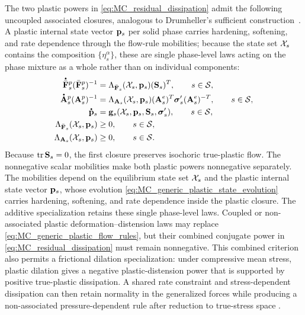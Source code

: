 The two plastic powers in \eqref{eq:MC_residual_dissipation} admit the following
uncoupled associated closures, analogous to Drumheller's sufficient
construction~\cite{drumheller2000}.  A plastic internal state vector
\(\mathbf{p}_s\) per solid phase carries hardening, softening, and rate
dependence through the flow-rule mobilities; because the state set \(\mathcal{X}_s\)
contains the composition \(\{\eta_s^\alpha\}\), these are single phase-level
laws acting on the phase mixture as a whole rather than on individual
components:
%
\begin{subequations}
	\label{eq:MC_generic_plastic_flow_rules}
	\begin{align}
		\phasedot{\bar{\mbf F}}_s^p(\bar{\mbf F}_s^p)^{-1}
		 & =
		\Lambda_{\bar{\mbf F}_s}(\mc X_s,\mbf p_s)
		(\mbf S_s)^T,
		\qquad
		s\in\mc S,
		\label{eq:MC_generic_plastic_deformation_flow_rule}            \\
		\phasedot{\mbf A}_s^p(\mbf A_s^p)^{-1}
		 & =
		\Lambda_{\mbf A_s}(\mc X_s,\mbf p_s)
		(\mbf A_s^e)^T
		\bs\sigma_s'
		(\mbf A_s^e)^{-T},
		\qquad
		s\in\mc S,
		\label{eq:MC_generic_plastic_distension_flow_rule}             \\
		\phasedot{\mbf p}_s
		 & =
		\mbf g_s
		(\mc X_s,\mbf p_s,\mbf S_s,\bs\sigma_s'),
		\qquad
		s\in\mc S,
		\label{eq:MC_generic_plastic_state_evolution} \\
		\Lambda_{\bar{\mbf F}_s}(\mc X_s,\mbf p_s)
		 & \ge0,
		\qquad
		s\in\mc S,
		\label{eq:MC_generic_plastic_deformation_mobility_nonnegative} \\
		\Lambda_{\mbf A_s}(\mc X_s,\mbf p_s)
		 & \ge0,
		\qquad
		s\in\mc S .
		\label{eq:MC_generic_plastic_distension_mobility_nonnegative}
	\end{align}
\end{subequations}
%
Because \(\operatorname{tr}\mathbf{S}_s=0\), the first closure preserves
isochoric true-plastic flow.  The nonnegative scalar mobilities make both
plastic powers nonnegative separately.  The mobilities depend on the
equilibrium state set \(\mathcal{X}_s\) and the plastic internal state vector
\(\mathbf{p}_s\), whose evolution
\eqref{eq:MC_generic_plastic_state_evolution} carries hardening, softening,
and rate dependence inside the plastic closure.  The additive specialization
retains these single phase-level laws.  Coupled or non-associated
plastic deformation--distension laws may replace
\eqref{eq:MC_generic_plastic_flow_rules}, but their combined conjugate power in
\eqref{eq:MC_residual_dissipation} must remain nonnegative.  This combined
criterion also permits a frictional dilation specialization: under compressive
mean stress, plastic dilation gives a negative plastic-distension power that is
supported by positive true-plastic dissipation.  A shared rate constraint and
stress-dependent
dissipation can then retain normality in the generalized forces while producing
a non-associated pressure-dependent rule after reduction to true-stress space
\cite{collins1997application}.

